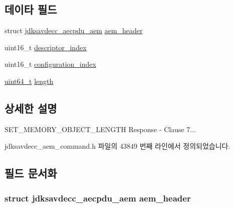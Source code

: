 \subsection*{데이타 필드}
\begin{DoxyCompactItemize}
\item 
struct \hyperlink{structjdksavdecc__aecpdu__aem}{jdksavdecc\+\_\+aecpdu\+\_\+aem} \hyperlink{structjdksavdecc__aem__command__get__memory__object__length__response_ae1e77ccb75ff5021ad923221eab38294}{aem\+\_\+header}
\item 
uint16\+\_\+t \hyperlink{structjdksavdecc__aem__command__get__memory__object__length__response_a042bbc76d835b82d27c1932431ee38d4}{descriptor\+\_\+index}
\item 
uint16\+\_\+t \hyperlink{structjdksavdecc__aem__command__get__memory__object__length__response_afaad1bd7c66f9611e134d8c5ce98f444}{configuration\+\_\+index}
\item 
\hyperlink{parse_8c_aec6fcb673ff035718c238c8c9d544c47}{uint64\+\_\+t} \hyperlink{structjdksavdecc__aem__command__get__memory__object__length__response_a190b76b1f3d5bd26920300e5f073739b}{length}
\end{DoxyCompactItemize}


\subsection{상세한 설명}
S\+E\+T\+\_\+\+M\+E\+M\+O\+R\+Y\+\_\+\+O\+B\+J\+E\+C\+T\+\_\+\+L\+E\+N\+G\+TH Response -\/ Clause 7... 

jdksavdecc\+\_\+aem\+\_\+command.\+h 파일의 43849 번째 라인에서 정의되었습니다.



\subsection{필드 문서화}
\subsubsection[{\texorpdfstring{aem\+\_\+header}{aem_header}}]{\setlength{\rightskip}{0pt plus 5cm}struct {\bf jdksavdecc\+\_\+aecpdu\+\_\+aem} aem\+\_\+header}\hypertarget{structjdksavdecc__aem__command__get__memory__object__length__response_ae1e77ccb75ff5021ad923221eab38294}{}\label{structjdksavdecc__aem__command__get__memory__object__length__response_ae1e77ccb75ff5021ad923221eab38294}


